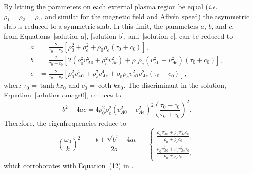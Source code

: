 \documentclass{aastex61}
\begin{document}
By letting the parameters on each external plasma region be equal (\textit{i.e.} $\rho_1 = \rho_2 = \rho_e$, and similar for the magnetic field and Aflv\'{e}n speed) the asymmetric slab is reduced to a symmetric slab. In this limit, the parameters $a$, $b$, and $c$, from Equations~\eqref{solution a}, \eqref{solution b}, and~\eqref{solution c}, can be reduced to
\begin{align}
a &= \frac{2}{\tau_0 + c_0} \left[ \rho_0^2 + \rho_e^2 + \rho_0\rho_e(\tau_0 + c_0) \right], \\
b &= \frac{2}{\tau_0 + c_0} \left[ 2(\rho_0^2v_{A0}^2 + \rho_e^2v_{Ae}^2) + \rho_0\rho_e(v_{A0}^2 + v_{Ae}^2)(\tau_0 + c_0) \right], \\
c &= \frac{2}{\tau_0 + c_0} \left[ \rho_0^2v_{A0}^4 + \rho_e^2v_{Ae}^4 + \rho_0\rho_ev_{A0}^2v_{Ae}^2(\tau_0 + c_0) \right],
\end{align}
where $\tau_0 = \tanh{kx_0}$ and $c_0 = \coth{kx_0}$. The discriminant in the solution, Equation~\eqref{solution omega0}, reduces to
\begin{equation}
b^2 - 4ac = 4\rho_0^2\rho_e^2(v_{A0}^2 - v_{Ae}^2)^2 \left(\frac{\tau_0 - c_0}{\tau_0 + c_0}\right)^2. 
\end{equation}
Therefore, the eigenfrequencies reduce to
\begin{equation}
\left(\frac{\omega_0}{k}\right)^2 = \frac{-b \pm \sqrt{b^2 - 4ac}}{2a} =
\begin{cases}
\frac{\rho_0v_{A0}^2 + \rho_ev_{Ae}^2c_0}{\rho_0 + \rho_ec_0}, \\
\frac{\rho_0v_{A0}^2 + \rho_ev_{Ae}^2\tau_0}{\rho_0 + \rho_e\tau_0},
\end{cases}
\end{equation}
which corroborates with Equation~(12) in \cite{rob81b}.


\end{document}
